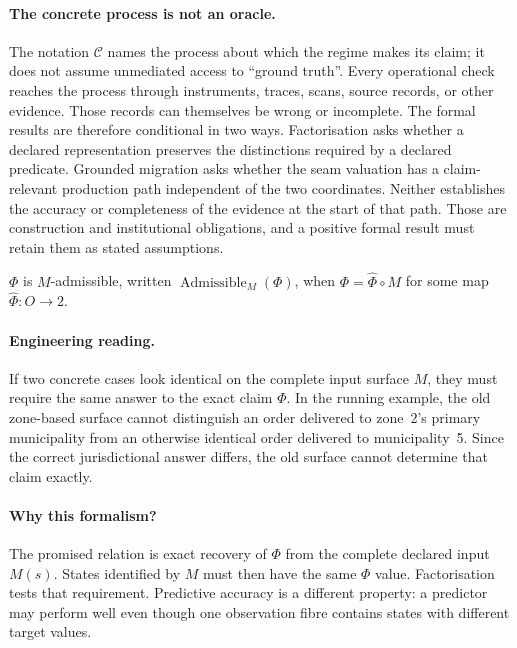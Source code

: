 \documentclass[twocolumn,envcountsect,envcountsame,natbib]{svjour3}
\begin{document}
\paragraph{The concrete process is not an oracle.} The notation $\mathcal{C}$ names the process about which the regime makes its claim; it does not assume unmediated access to ``ground truth''. Every operational check reaches the process through instruments, traces, scans, source records, or other evidence. Those records can themselves be wrong or incomplete. The formal results are therefore conditional in two ways. Factorisation asks whether a declared representation preserves the distinctions required by a declared predicate. Grounded migration asks whether the seam valuation has a claim-relevant production path independent of the two coordinates. Neither establishes the accuracy or completeness of the evidence at the start of that path. Those are construction and institutional obligations, and a positive formal result must retain them as stated assumptions.

\begin{definition}\label{ex:def:admissible}
$\Phi$ is $M$-admissible, written $\operatorname{Admissible}_M(\Phi)$, when $\Phi=\widehat\Phi \circ M$ for some map $\widehat\Phi:O\to 2$.
\end{definition}

\paragraph{Engineering reading.} If two concrete cases look identical on the complete input surface $M$, they must require the same answer to the exact claim $\Phi$. In the running example, the old zone-based surface cannot distinguish an order delivered to zone~2's primary municipality from an otherwise identical order delivered to municipality~5. Since the correct jurisdictional answer differs, the old surface cannot determine that claim exactly.

\paragraph{Why this formalism?} The promised relation is exact recovery of $\Phi$ from the complete declared input $M(s)$. States identified by $M$ must then have the same $\Phi$ value. Factorisation tests that requirement. Predictive accuracy is a different property: a predictor may perform well even though one observation fibre contains states with different target values.
\end{document}
